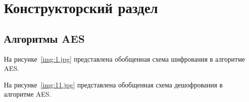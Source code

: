 \section{Конструкторский раздел}

\subsection{Алгоритмы AES}

На рисунке~\ref{img:1.jpg} представлена обобщенная схема шифрования в алгоритме AES.


На рисунке~\ref{img:11.jpg} представлена обобщенная схема дешофрования в алгоритме AES.


\newpage